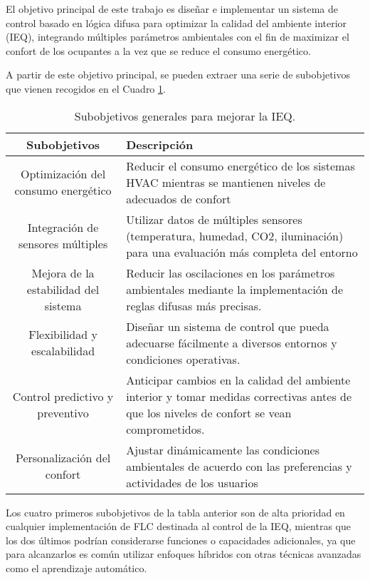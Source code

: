 El objetivo principal de este trabajo es diseñar e implementar un sistema de control basado en lógica difusa para optimizar la calidad del ambiente interior (IEQ), integrando múltiples parámetros ambientales con el fin de maximizar el confort de los ocupantes a la vez que se reduce el consumo energético.

A partir de este objetivo principal, se pueden extraer una serie de subobjetivos que vienen recogidos en el Cuadro \ref{tab:subobjetivos}.

\begin{table}[H]
	\centering
	\begin{tabular}{| c | p{9.6cm} |}
		\hline
		\rowcolor{lightgray}
		\textbf{Subobjetivos} & \textbf{Descripción} \\
		\hline
		Optimización del consumo energético & 
		Reducir el consumo energético de los sistemas HVAC mientras se mantienen niveles de adecuados de confort \vspace{0.2cm} \\
		\hline
		Integración de sensores múltiples & 
		Utilizar datos de múltiples sensores (temperatura, humedad, CO2, iluminación) para una evaluación más completa del entorno 
		\vspace{0.2cm} \\
		\hline
		Mejora de la estabilidad del sistema & 
		Reducir las oscilaciones en los parámetros ambientales mediante la implementación de reglas difusas más precisas.
		\vspace{0.2cm} \\
		\hline
		Flexibilidad y escalabilidad & 
		Diseñar un sistema de control que pueda adecuarse fácilmente a diversos entornos y condiciones operativas.
		\vspace{0.2cm} \\
		\hline
		Control predictivo y preventivo & 
		Anticipar cambios en la calidad del ambiente interior y tomar medidas correctivas antes de que los niveles de confort se vean comprometidos.
		\vspace{0.2cm} \\
		\hline
		Personalización del confort &
		Ajustar dinámicamente las condiciones ambientales de acuerdo con las preferencias y actividades de los usuarios
		\vspace{0.2cm} \\
		\hline
	\end{tabular}
	\caption{Subobjetivos generales para mejorar la IEQ.}
	\label{tab:subobjetivos}
\end{table}

Los cuatro primeros subobjetivos de la tabla anterior son de alta prioridad en cualquier implementación de FLC destinada al control de la IEQ, mientras que los dos últimos podrían considerarse funciones o capacidades adicionales, ya que para alcanzarlos es común utilizar enfoques híbridos con otras técnicas avanzadas como el aprendizaje automático.